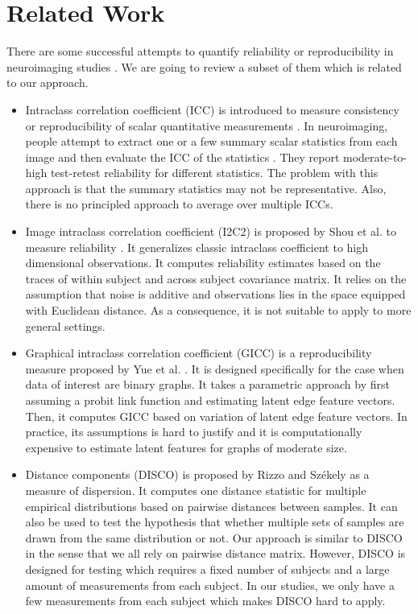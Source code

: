\documentclass{article}
\begin{document}
\section{Related Work}
There are some successful attempts to quantify reliability or reproducibility in neuroimaging studies \cite{shrout1979intraclass,strother2002quantitative,rizzo2010disco,zuo2010reliable,braun2012test,shou2013quantifying,yue2015estimating,yu2013stability}. We are going to review a subset of them which is related to our approach.
\begin{itemize}
	\item Intraclass correlation coefficient (ICC) is introduced to measure consistency or reproducibility of scalar quantitative measurements \cite{shrout1979intraclass}. In neuroimaging, people attempt to extract one or a few summary scalar statistics from each image and then evaluate the ICC of the statistics \cite{zuo2010reliable,braun2012test}. They report moderate-to-high test-retest reliability for different statistics. The problem with this approach is that the summary statistics may not be representative. Also, there is no principled approach to average over multiple ICCs. 
	\item Image intraclass correlation coefficient (I2C2) is proposed by Shou et al. to measure reliability  \cite{shou2013quantifying}. It generalizes classic intraclass coefficient to high dimensional observations. It computes reliability estimates based on the traces of within subject and across subject covariance matrix. It relies on the assumption that noise is additive and observations lies in the space equipped with Euclidean distance. As a consequence, it is not suitable to apply to more general settings. 
	\item Graphical intraclass correlation coefficient (GICC) is a reproducibility measure proposed by Yue et al. \cite{yue2015estimating}. It is designed specifically for the case when data of interest are binary graphs. It takes a parametric approach by first assuming a probit link function and estimating latent edge feature vectors. Then, it computes GICC based on variation of latent edge feature vectors. In practice, its assumptions is hard to justify and it is computationally expensive to estimate latent features for graphs of moderate size. 
	\item Distance components (DISCO) is proposed by Rizzo and Sz{\'e}kely as a measure of dispersion\cite{rizzo2010disco}. It computes one distance statistic for multiple empirical distributions based on pairwise distances between samples. It can also be used to test the hypothesis that whether multiple sets of samples are drawn from the same distribution or not. Our approach is similar to DISCO in the sense that we all rely on pairwise distance matrix. However, DISCO is designed for testing which requires a fixed number of subjects and a large amount of measurements from each subject. In our studies, we only have a few measurements from each subject which makes DISCO hard to apply.  

\end{itemize}
\end{document}
